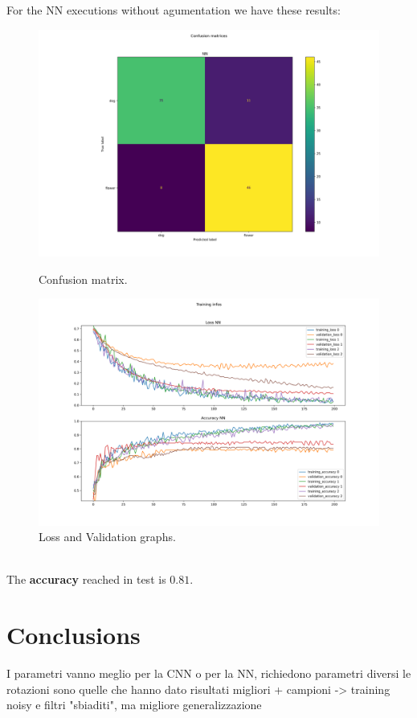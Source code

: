 \documentclass{report}
\def\weight{0.7}
\begin{document}
\pagebreak

For the NN executions without agumentation we have these results:
\begin{figure}[ht!]
  \centering
  \begin{minipage}[b]{\weight\linewidth}
    \includegraphics[width=\linewidth]{2.senza_augmentationNN/conf_mat.png}
    \caption{Confusion matrix.}
    \label{fig:image1}
  \end{minipage}
  \hspace{0.5cm}
  \begin{minipage}[b]{\weight\linewidth}
    \includegraphics[width=\linewidth]{2.senza_augmentationNN/training_infos.png}
    \caption{Loss and Validation graphs.}
    \label{fig:image2}
  \end{minipage}
\end{figure}\\
The \textbf{accuracy} reached in test is $0.81$.\\


\chapter{Conclusions}
I parametri vanno meglio per la CNN o per la NN, richiedono parametri diversi
le rotazioni sono quelle che hanno dato risultati migliori
+ campioni -> training noisy e filtri "sbiaditi", ma migliore generalizzazione
\end{document}
